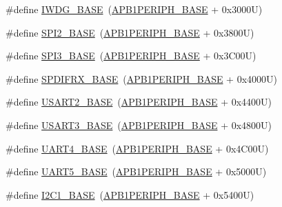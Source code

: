 \begin{DoxyCompactItemize}
\item 
\#define \hyperlink{group___peripheral__memory__map_ga8543ee4997296af5536b007cd4748f55}{I\+W\+D\+G\+\_\+\+B\+A\+SE}~(\hyperlink{group___peripheral__memory__map_ga45666d911f39addd4c8c0a0ac3388cfb}{A\+P\+B1\+P\+E\+R\+I\+P\+H\+\_\+\+B\+A\+SE} + 0x3000\+U)
\item 
\#define \hyperlink{group___peripheral__memory__map_gac3e357b4c25106ed375fb1affab6bb86}{S\+P\+I2\+\_\+\+B\+A\+SE}~(\hyperlink{group___peripheral__memory__map_ga45666d911f39addd4c8c0a0ac3388cfb}{A\+P\+B1\+P\+E\+R\+I\+P\+H\+\_\+\+B\+A\+SE} + 0x3800\+U)
\item 
\#define \hyperlink{group___peripheral__memory__map_gae634fe8faa6922690e90fbec2fc86162}{S\+P\+I3\+\_\+\+B\+A\+SE}~(\hyperlink{group___peripheral__memory__map_ga45666d911f39addd4c8c0a0ac3388cfb}{A\+P\+B1\+P\+E\+R\+I\+P\+H\+\_\+\+B\+A\+SE} + 0x3\+C00\+U)
\item 
\#define \hyperlink{group___peripheral__memory__map_gad0c89d1e156c49602ce73483b74c2b6a}{S\+P\+D\+I\+F\+R\+X\+\_\+\+B\+A\+SE}~(\hyperlink{group___peripheral__memory__map_ga45666d911f39addd4c8c0a0ac3388cfb}{A\+P\+B1\+P\+E\+R\+I\+P\+H\+\_\+\+B\+A\+SE} + 0x4000\+U)
\item 
\#define \hyperlink{group___peripheral__memory__map_gade83162a04bca0b15b39018a8e8ec090}{U\+S\+A\+R\+T2\+\_\+\+B\+A\+SE}~(\hyperlink{group___peripheral__memory__map_ga45666d911f39addd4c8c0a0ac3388cfb}{A\+P\+B1\+P\+E\+R\+I\+P\+H\+\_\+\+B\+A\+SE} + 0x4400\+U)
\item 
\#define \hyperlink{group___peripheral__memory__map_gabe0d6539ac0026d598274ee7f45b0251}{U\+S\+A\+R\+T3\+\_\+\+B\+A\+SE}~(\hyperlink{group___peripheral__memory__map_ga45666d911f39addd4c8c0a0ac3388cfb}{A\+P\+B1\+P\+E\+R\+I\+P\+H\+\_\+\+B\+A\+SE} + 0x4800\+U)
\item 
\#define \hyperlink{group___peripheral__memory__map_ga94d92270bf587ccdc3a37a5bb5d20467}{U\+A\+R\+T4\+\_\+\+B\+A\+SE}~(\hyperlink{group___peripheral__memory__map_ga45666d911f39addd4c8c0a0ac3388cfb}{A\+P\+B1\+P\+E\+R\+I\+P\+H\+\_\+\+B\+A\+SE} + 0x4\+C00\+U)
\item 
\#define \hyperlink{group___peripheral__memory__map_gaa155689c0e206e6994951dc3cf31052a}{U\+A\+R\+T5\+\_\+\+B\+A\+SE}~(\hyperlink{group___peripheral__memory__map_ga45666d911f39addd4c8c0a0ac3388cfb}{A\+P\+B1\+P\+E\+R\+I\+P\+H\+\_\+\+B\+A\+SE} + 0x5000\+U)
\item 
\#define \hyperlink{group___peripheral__memory__map_gacd72dbffb1738ca87c838545c4eb85a3}{I2\+C1\+\_\+\+B\+A\+SE}~(\hyperlink{group___peripheral__memory__map_ga45666d911f39addd4c8c0a0ac3388cfb}{A\+P\+B1\+P\+E\+R\+I\+P\+H\+\_\+\+B\+A\+SE} + 0x5400\+U)

\end{DoxyCompactItemize}
